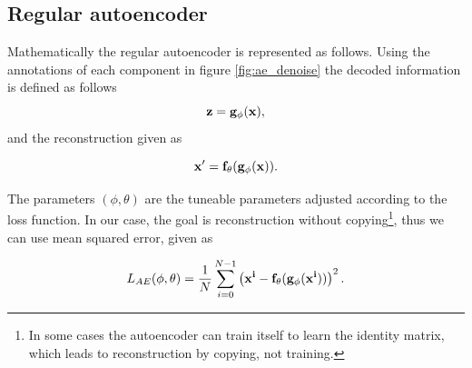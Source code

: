 \subsection{Regular autoencoder}
Mathematically the regular autoencoder is represented as follows\cite{weng2018VAE}. 
Using the annotations of each component in figure \ref{fig:ae_denoise} the decoded information is defined as follows 
\begin{equation*}
    \bf{z} = g_{\phi}(\bf{x}),
\end{equation*}    
and the reconstruction given as 

\begin{equation*}
    \bf{x'} = f_{\theta}(g_{\phi}(\bf{x})).
\end{equation*}  

The parameters $(\phi,\theta)$ are the tuneable parameters adjusted according to the loss function. In our case, the goal is
reconstruction without copying\footnote{In some cases the autoencoder can train itself to learn the identity matrix, 
which leads to reconstruction by copying, not training.}, thus we can use mean squared error, given as 

\begin{equation}\label{eq:loss_ae}
    L_{AE} (\phi,\theta) = \frac{1}{N}\sum_{i=0}^{N-1} \left(\bf{x}^{i} - f_{\theta}(g_{\phi}(\bf{x}^{i}))\right)^{2}.
\end{equation}

